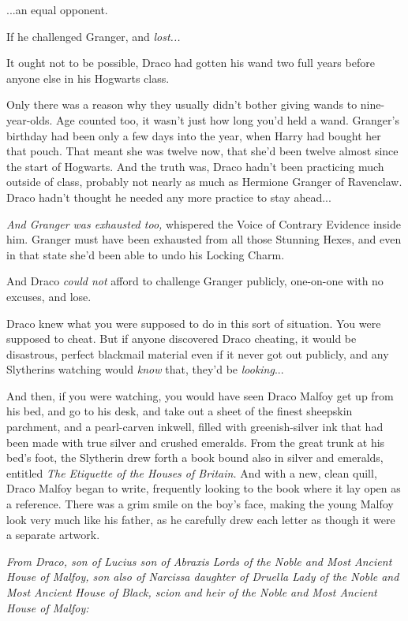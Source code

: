 ...an equal opponent.

If he challenged Granger, and \emph{lost...}

It ought not to be possible, Draco had gotten his wand two full years
before anyone else in his Hogwarts class.

Only there was a reason why they usually didn't bother giving wands to
nine-year-olds. Age counted too, it wasn't just how long you'd held a
wand. Granger's birthday had been only a few days into the year, when
Harry had bought her that pouch. That meant she was twelve now, that
she'd been twelve almost since the start of Hogwarts. And the truth was,
Draco hadn't been practicing much outside of class, probably not nearly
as much as Hermione Granger of Ravenclaw. Draco hadn't thought he needed
any more practice to stay ahead...

\emph{And Granger was exhausted too,} whispered the Voice of Contrary
Evidence inside him. Granger must have been exhausted from all those
Stunning Hexes, and even in that state she'd been able to undo his
Locking Charm.

And Draco \emph{could not} afford to challenge Granger publicly,
one-on-one with no excuses, and lose.

Draco knew what you were supposed to do in this sort of situation. You
were supposed to cheat. But if anyone discovered Draco cheating, it
would be disastrous, perfect blackmail material even if it never got out
publicly, and any Slytherins watching would \emph{know} that, they'd be
\emph{looking}...

And then, if you were watching, you would have seen Draco Malfoy get up
from his bed, and go to his desk, and take out a sheet of the finest
sheepskin parchment, and a pearl-carven inkwell, filled with
greenish-silver ink that had been made with true silver and crushed
emeralds. From the great trunk at his bed's foot, the Slytherin drew
forth a book bound also in silver and emeralds, entitled \emph{The
Etiquette of the Houses of Britain.} And with a new, clean quill, Draco
Malfoy began to write, frequently looking to the book where it lay open
as a reference. There was a grim smile on the boy's face, making the
young Malfoy look very much like his father, as he carefully drew each
letter as though it were a separate artwork.

\emph{From Draco, son of Lucius son of Abraxis Lords of the Noble and
Most Ancient House of Malfoy, son also of Narcissa daughter of Druella
Lady of the Noble and Most Ancient House of Black, scion and heir of the
Noble and Most Ancient House of Malfoy:}

